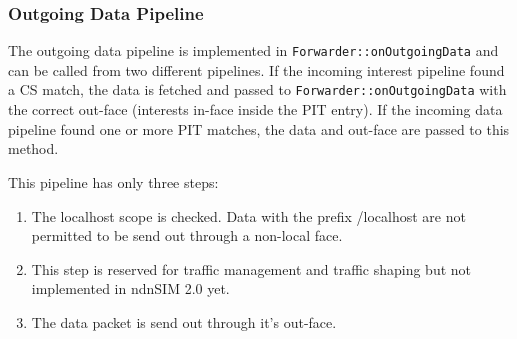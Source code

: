\subsubsection{Outgoing Data Pipeline}

The outgoing data pipeline is implemented in \texttt{Forwarder::onOutgoingData} and can be called from two different pipelines. If the incoming interest pipeline found a CS match, the data is fetched and passed to \texttt{Forwarder::onOutgoingData} with the correct out-face (interests in-face inside the PIT entry). If the incoming data pipeline found one or more PIT matches, the data and out-face are passed to this method.

This pipeline has only three steps:

\begin{enumerate}
\item The localhost scope is checked. Data with the prefix /localhost are not permitted to be send out through a non-local face.
\item This step is reserved for traffic management and traffic shaping but not implemented in ndnSIM 2.0 yet.
\item The data packet is send out through it's out-face.
\end{enumerate}

